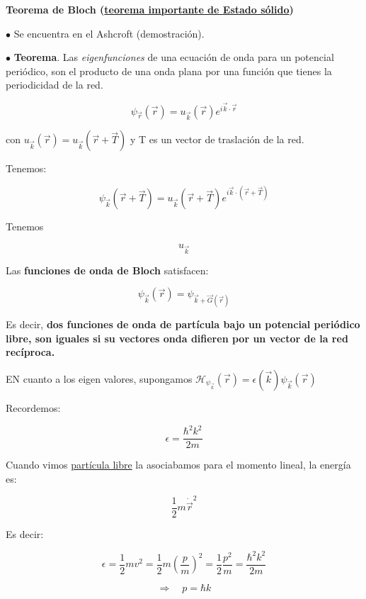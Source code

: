 \documentclass{article}
\begin{document}
\textbf{Teorema de Bloch (\underline{teorema importante de \textcolor{Apple Green}{\textbf{Estado sólido}}})}


$\bullet$ Se encuentra en el Ashcroft (demostración).



$\bullet$ \textbf{Teorema}. Las \emph{eigenfunciones} de una ecuación de onda para un potencial periódico, son el producto de una onda plana por una función que tienes la periodicidad de la red. 


\[   \psi_{\vec{r}}(\vec{r}) = u_{\vec{k}}(\vec{r}) e^{i \vec{k} \cdot \vec{r}}   \]



con $u_{\vec{k}}(\vec{r}) = u_{\vec{k}}(\vec{r} + \vec{T} )$ y T es un vector de traslación de la red.

Tenemos:



\[ \psi_{\vec{k}} (\vec{r} + \vec{T}) = u_{\vec{k}} ( \vec{r} + \vec{T} ) e^{i \vec{k} \cdot (\vec{r} + \vec{T})} \]



Tenemos

\[ u_{\vec{k}}  \]


Las \textbf{funciones de onda de Bloch} satisfacen:



\[ \boxed{  \psi_{\vec{k} } (\vec{r}) = \psi_{\vec{k} + \vec{G}(\vec{r}) }}  \]

Es decir, \textcolor{trueblue}{\textbf{dos funciones de onda de partícula bajo un potencial periódico libre, son iguales si su vectores onda difieren por un vector de la red recíproca.}}


EN cuanto a los eigen valores, supongamos $\mathcal{H}_{\psi_{\vec{k}}}(\vec{r}) = \epsilon(\vec{k}) \psi_{\vec{k}}(\vec{r})$


Recordemos:


\[   \epsilon = \frac{  \hbar^{2}k^{2} }{2m}   \]

Cuando vimos \underline{partícula libre} la asociabamos para el momento lineal, la energía es:


\[ \frac{1}{2}m\dot{\vec{r}}^{2} \]

Es decir:

\[ \epsilon = \frac{1}{2} mv^{2} = \frac{1}{2}m \left(  \frac{p}{m}  \right)^{2} = \frac{1}{2} \frac{p^{2}}{m} = \frac{\hbar^{2}k^{2}   }{2m} \]


\[ \Rightarrow \quad \boxed{  p = \hbar k } \]
\end{document}
